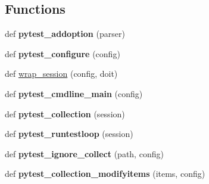 \subsection*{Functions}
\begin{DoxyCompactItemize}
\item 
\mbox{\label{namespace__pytest_1_1main_a77e7847f17aaa913e69656594281bc54}} 
def {\bfseries pytest\+\_\+addoption} (parser)
\item 
\mbox{\label{namespace__pytest_1_1main_a43c42f10da76f6841499584603bdb538}} 
def {\bfseries pytest\+\_\+configure} (config)
\item 
def \hyperlink{namespace__pytest_1_1main_a68138e010c9e1b4941cfcce684b9c7b6}{wrap\+\_\+session} (config, doit)
\item 
\mbox{\label{namespace__pytest_1_1main_a0b5deda154838cabf906adb004cb7b3c}} 
def {\bfseries pytest\+\_\+cmdline\+\_\+main} (config)
\item 
\mbox{\label{namespace__pytest_1_1main_ae105c6816164a128402a3df8a9827635}} 
def {\bfseries pytest\+\_\+collection} (session)
\item 
\mbox{\label{namespace__pytest_1_1main_a8e1009c55ac370f89cad9e5f32955cc3}} 
def {\bfseries pytest\+\_\+runtestloop} (session)
\item 
\mbox{\label{namespace__pytest_1_1main_a37f744486eb5e3b26d637407365636a0}} 
def {\bfseries pytest\+\_\+ignore\+\_\+collect} (path, config)
\item 
\mbox{\label{namespace__pytest_1_1main_a24da07c7181f46cf391830a6f97185d2}} 
def {\bfseries pytest\+\_\+collection\+\_\+modifyitems} (items, config)
\end{DoxyCompactItemize}
